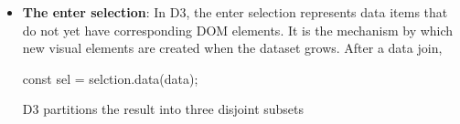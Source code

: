 \documentclass{report}
\begin{document}
\begin{itemize}
            \bigbreak \noindent 
            If we write
            \bigbreak \noindent 
            \begin{jscode}
            selection.data(data)
            \end{jscode}
            \bigbreak \noindent 
            D3 matches data to elements by index (position):
            \begin{itemize}
                \item First data item $\to$ first element
                \item Second $\to$ second
            \end{itemize}
            etc... With a key,
            \bigbreak \noindent 
            \begin{jscode}
            selection.data(data, key)
            \end{jscode}
            \bigbreak \noindent 
            D3 matches elements by identity, not position. The key function returns a unique identifier for each datum.
            \bigbreak \noindent 
            \begin{jscode}
            (d, i) => keyValue
            \end{jscode}
            \bigbreak \noindent 
            Suppose the data is
            \bigbreak \noindent 
            \begin{jscode}
            const data = [
                { id: 101, name: "Alice" },
                { id: 102, name: "Bob" }
            ];
            \end{jscode}
            \bigbreak \noindent 
            Then, the key could be 
            \bigbreak \noindent 
            \begin{jscode}
                svg.selectAll("circle")
                .data(data, d => d.id);
            \end{jscode}
            \bigbreak \noindent 
            D3 now tracks circles by id, not position.
        \item \textbf{The enter selection}: In D3, the enter selection represents data items that do not yet have corresponding DOM elements. It is the mechanism by which new visual elements are created when the dataset grows. 
            \bigbreak \noindent 
            After a data join,
            \bigbreak \noindent 
            \begin{jscode}
            const sel = selction.data(data);
            \end{jscode}
            \bigbreak \noindent 
            D3 partitions the result into three disjoint subsets

\end{itemize}
\end{document}
